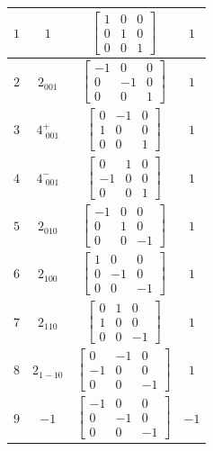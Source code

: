 \documentclass[fleqn,8pt]{jsarticle}
\begin{document}
\begin{longtable}{cccc}
$ 1 $ & $ 1 $ & $ \begin{bmatrix} 1 & 0 & 0 \\ 0 & 1 & 0 \\ 0 & 0 & 1 \end{bmatrix} $ & $ 1 $ \\ \hline
$ 2 $ & $ 2{}_{001} $ & $ \begin{bmatrix} -1 & 0 & 0 \\ 0 & -1 & 0 \\ 0 & 0 & 1 \end{bmatrix} $ & $ 1 $ \\ \hline
$ 3 $ & $ 4^{+}_{\,\,001} $ & $ \begin{bmatrix} 0 & -1 & 0 \\ 1 & 0 & 0 \\ 0 & 0 & 1 \end{bmatrix} $ & $ 1 $ \\ \hline
$ 4 $ & $ 4^{-}_{\,\,001} $ & $ \begin{bmatrix} 0 & 1 & 0 \\ -1 & 0 & 0 \\ 0 & 0 & 1 \end{bmatrix} $ & $ 1 $ \\ \hline
$ 5 $ & $ 2{}_{010} $ & $ \begin{bmatrix} -1 & 0 & 0 \\ 0 & 1 & 0 \\ 0 & 0 & -1 \end{bmatrix} $ & $ 1 $ \\ \hline
$ 6 $ & $ 2{}_{100} $ & $ \begin{bmatrix} 1 & 0 & 0 \\ 0 & -1 & 0 \\ 0 & 0 & -1 \end{bmatrix} $ & $ 1 $ \\ \hline
$ 7 $ & $ 2{}_{110} $ & $ \begin{bmatrix} 0 & 1 & 0 \\ 1 & 0 & 0 \\ 0 & 0 & -1 \end{bmatrix} $ & $ 1 $ \\ \hline
$ 8 $ & $ 2{}_{1-10} $ & $ \begin{bmatrix} 0 & -1 & 0 \\ -1 & 0 & 0 \\ 0 & 0 & -1 \end{bmatrix} $ & $ 1 $ \\ \hline
$ 9 $ & $ -1 $ & $ \begin{bmatrix} -1 & 0 & 0 \\ 0 & -1 & 0 \\ 0 & 0 & -1 \end{bmatrix} $ & $ -1 $ \\ \hline

\end{longtable}
\end{document}
